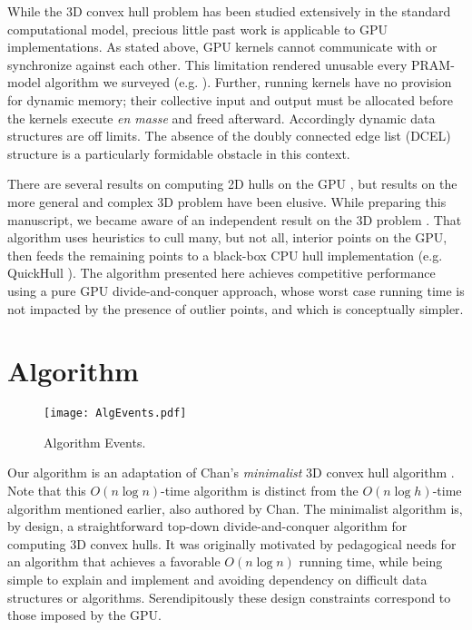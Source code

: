 \documentclass{article}
\begin{document}
While the 3D convex hull problem has been studied extensively in the standard computational model, precious little past work is applicable to GPU implementations. As stated above, GPU kernels cannot communicate with or synchronize against each other. This limitation rendered unusable every PRAM-model algorithm we surveyed (e.g. \cite{pram_alg}). Further, running kernels have no provision for dynamic memory; their collective input and output must be allocated before the kernels execute \emph{en masse} and freed afterward. Accordingly dynamic data structures are off limits. The absence of the doubly connected edge list (DCEL) structure is a particularly formidable obstacle in this context.

There are several results on computing 2D hulls on the GPU  \cite{JurkiewiczDanilewski2011} \cite{ro08cuda} \cite{5763404}, but results on the more general and complex 3D problem have been elusive. While preparing this manuscript, we became aware of an independent result on the 3D problem \cite{ghull}. That algorithm uses heuristics to cull many, but not all, interior points on the GPU, then feeds the remaining points to a black-box CPU hull implementation (e.g. QuickHull \cite{Barber:1996:QAC:235815.235821}). The algorithm presented here achieves competitive performance using a pure GPU divide-and-conquer approach, whose worst case running time is not impacted by the presence of outlier points, and which is conceptually simpler.

\section{Algorithm}

\begin{figure}
\centering
\texttt{[image: AlgEvents.pdf]}
\caption{Algorithm Events.}
\label{algorithm_events}
\end{figure}

Our algorithm is an adaptation of Chan's \emph{minimalist} 3D convex hull algorithm \cite{chan_minimalist}. Note that this $O(n \log n)$-time algorithm is distinct from the $O(n \log h)$-time algorithm mentioned earlier, also authored by Chan. The minimalist algorithm is, by design, a straightforward top-down divide-and-conquer algorithm for computing 3D convex hulls. It was originally motivated by pedagogical needs for an algorithm that achieves a favorable $O(n \log n)$ running time, while being simple to explain and implement and avoiding dependency on difficult data structures or algorithms. Serendipitously these design constraints correspond to those imposed by the GPU.
\end{document}

